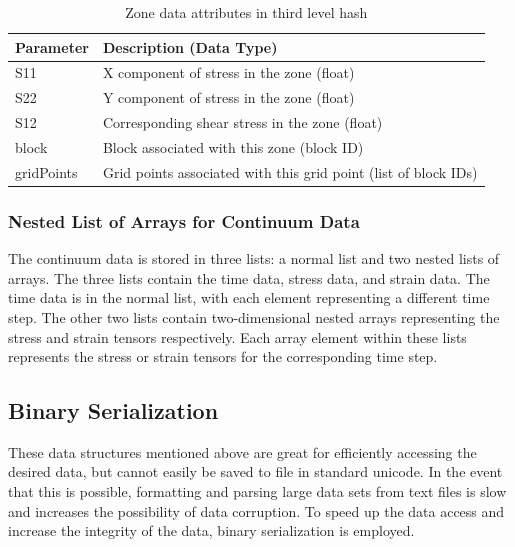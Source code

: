 \begin{table}[!htb]
\centering
\caption{Zone data attributes in third level hash}
\label{tab:keys6}
\begin{tabularx}{\textwidth}{@{}Yp{0.75\textwidth}@{}}
\toprule
\textbf{Parameter} & \textbf{Description (Data Type)}                                \\ \midrule
S11                & X component of stress in the zone (float)                       \\
S22                & Y component of stress in the zone (float)                       \\
S12                & Corresponding shear stress in the zone (float)                  \\
block              & Block associated with this zone (block ID)                      \\
gridPoints         & Grid points associated with this grid point (list of block IDs)\\ \bottomrule
\end{tabularx}
\end{table}

\subsubsection*{Nested List of Arrays for Continuum Data}

The continuum data is stored in three lists: a normal list and two nested lists of arrays. The three lists contain the time data, stress data, and strain data. The time data is in the normal list, with each element representing a different time step. The other two lists contain two-dimensional nested arrays representing the stress and strain tensors respectively. Each array element within these lists represents the stress or strain tensors for the corresponding time step.

\subsection{Binary Serialization}

These data structures mentioned above are great for efficiently accessing the desired data, but cannot easily be saved to file in standard unicode. In the event that this is possible, formatting and parsing large data sets from text files is slow and increases the possibility of data corruption. To speed up the data access and increase the integrity of the data, binary serialization is employed. 

